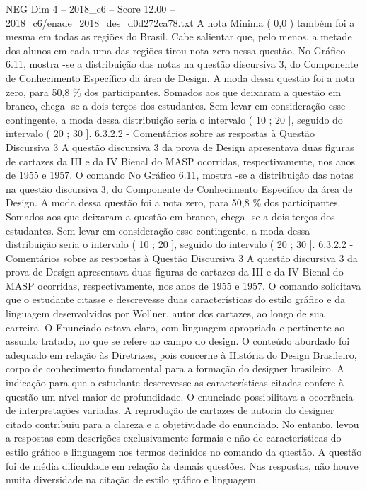 \begin{textsample}{NEG Dim 4 – 2018\_c6 – Score 12.00 – 2018\_c6/enade\_2018\_des\_d0d272ca78.txt}
A nota Mínima ( 0,0 ) também foi a mesma em todas as regiões do Brasil.
Cabe salientar que, pelo menos, a metade dos alunos em cada uma das regiões tirou nota zero nessa questão.
No Gráfico 6.11, mostra -se a distribuição das notas na questão discursiva 3, do Componente de Conhecimento Específico da área de Design.
A moda dessa questão foi a nota zero, para 50,8 \% dos participantes.
Somados aos que deixaram a questão em branco, chega -se a dois terços dos estudantes.
Sem levar em consideração esse contingente, a moda dessa distribuição seria o intervalo ( 10 ; 20 ], seguido do intervalo ( 20 ; 30 ]. 6.3.2.2 - Comentários sobre as respostas à Questão Discursiva 3 A questão discursiva 3 da prova de Design apresentava duas figuras de cartazes da III e da IV Bienal do MASP ocorridas, respectivamente, nos anos de 1955 e 1957.
O comando No Gráfico 6.11, mostra -se a distribuição das notas na questão discursiva 3, do Componente de Conhecimento Específico da área de Design.
A moda dessa questão foi a nota zero, para 50,8 \% dos participantes.
Somados aos que deixaram a questão em branco, chega -se a dois terços dos estudantes.
Sem levar em consideração esse contingente, a moda dessa distribuição seria o intervalo ( 10 ; 20 ], seguido do intervalo ( 20 ; 30 ]. 6.3.2.2 - Comentários sobre as respostas à Questão Discursiva 3 A questão discursiva 3 da prova de Design apresentava duas figuras de cartazes da III e da IV Bienal do MASP ocorridas, respectivamente, nos anos de 1955 e 1957.
O comando solicitava que o estudante citasse e descrevesse duas características do estilo gráfico e da linguagem desenvolvidos por Wollner, autor dos cartazes, ao longo de sua carreira.
O Enunciado estava claro, com linguagem apropriada e pertinente ao assunto tratado, no que se refere ao campo do design.
O conteúdo abordado foi adequado em relação às Diretrizes, pois concerne à História do Design Brasileiro, corpo de conhecimento fundamental para a formação do designer brasileiro.
A indicação para que o estudante descrevesse as características citadas confere à questão um nível maior de profundidade.
O enunciado possibilitava a ocorrência de interpretações variadas.
A reprodução de cartazes de autoria do designer citado contribuiu para a clareza e a objetividade do enunciado.
No entanto, levou a respostas com descrições exclusivamente formais e não de características do estilo gráfico e linguagem nos termos definidos no comando da questão.
A questão foi de média dificuldade em relação às demais questões.
Nas respostas, não houve muita diversidade na citação de estilo gráfico e linguagem.

\end{textsample}
